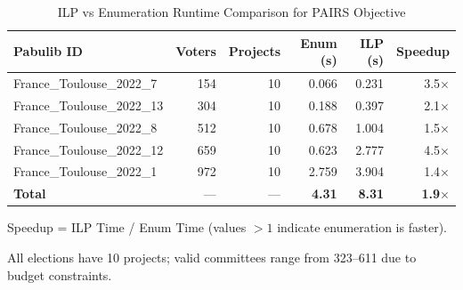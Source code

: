
\begin{table}[htbp]
\centering
\caption{ILP vs Enumeration Runtime Comparison for PAIRS Objective}
\label{tab:ilp-vs-enum}
\begin{tabular}{lrrrrr}
\toprule
\textbf{Pabulib ID} & \textbf{Voters} & \textbf{Projects} & \textbf{Enum (s)} & \textbf{ILP (s)} & \textbf{Speedup} \\
\midrule
France\_Toulouse\_2022\_7  & 154 & 10 & 0.066 & 0.231 & 3.5$\times$ \\
France\_Toulouse\_2022\_13 & 304 & 10 & 0.188 & 0.397 & 2.1$\times$ \\
France\_Toulouse\_2022\_8  & 512 & 10 & 0.678 & 1.004 & 1.5$\times$ \\
France\_Toulouse\_2022\_12 & 659 & 10 & 0.623 & 2.777 & 4.5$\times$ \\
France\_Toulouse\_2022\_1  & 972 & 10 & 2.759 & 3.904 & 1.4$\times$ \\
\midrule
\textbf{Total} & --- & --- & \textbf{4.31} & \textbf{8.31} & \textbf{1.9$\times$} \\
\bottomrule
\end{tabular}
\begin{tablenotes}
\small
\item Speedup = ILP Time / Enum Time (values $>1$ indicate enumeration is faster).
\item All elections have 10 projects; valid committees range from 323--611 due to budget constraints.
\end{tablenotes}
\end{table}
